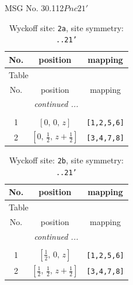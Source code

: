 \documentclass[fleqn,8pt]{jsarticle}
\begin{document}
\setcounter{MaxMatrixCols}{32}

\renewcommand{\tablename}{Table~}
\renewcommand{\figurename}{Figure~}
\begin{center}
\LARGE
MSG No. 30.112\quad$Pnc21'$
\end{center}
\renewcommand{\arraystretch}{1.2}
\begin{longtable}{ccc}
\caption{Wyckoff site: {\tt 2a}, site symmetry: {\tt ..21'}}
 \\
 \hline \hline
No. & position & mapping \\ \hline \endfirsthead

\multicolumn{2}{l}{\tablename\ \thetable{}} \\
 \hline \hline
No. & position & mapping \\ \hline \endhead

 \hline \hline
\multicolumn{2}{r}{\footnotesize\it continued ...} \\ \endfoot

 \hline \hline
\multicolumn{2}{r}{} \\ \endlastfoot

1 & $\left[ 0,\, 0,\, z \right]$ & {\tt [1,2,5,6]} \\ \hline
2 & $\left[ 0,\, \frac{1}{2},\, z + \frac{1}{2} \right]$ & {\tt [3,4,7,8]} \\
\end{longtable}
\renewcommand{\arraystretch}{1.2}
\begin{longtable}{ccc}
\caption{Wyckoff site: {\tt 2b}, site symmetry: {\tt ..21'}}
 \\
 \hline \hline
No. & position & mapping \\ \hline \endfirsthead

\multicolumn{2}{l}{\tablename\ \thetable{}} \\
 \hline \hline
No. & position & mapping \\ \hline \endhead

 \hline \hline
\multicolumn{2}{r}{\footnotesize\it continued ...} \\ \endfoot

 \hline \hline
\multicolumn{2}{r}{} \\ \endlastfoot

1 & $\left[ \frac{1}{2},\, 0,\, z \right]$ & {\tt [1,2,5,6]} \\ \hline
2 & $\left[ \frac{1}{2},\, \frac{1}{2},\, z + \frac{1}{2} \right]$ & {\tt [3,4,7,8]} \\
\end{longtable}
\end{document}

